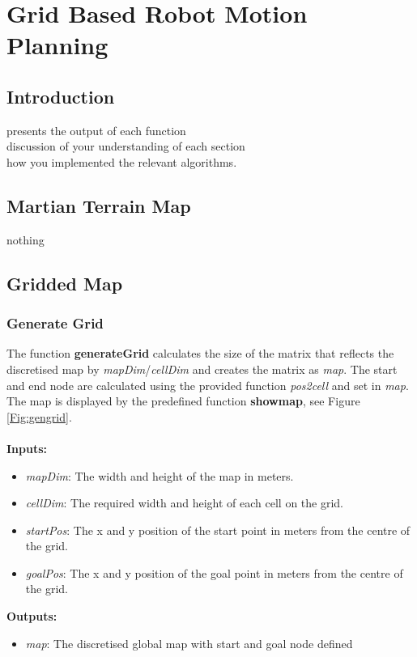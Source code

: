 \documentclass[Space3_Assign3.tex]{subfile}
\begin{document}
\section{Grid Based Robot Motion Planning} \label{Sec:Question1}
\subsection{Introduction}

presents the output of each function\\
discussion of your understanding of each section\\
how you implemented the relevant algorithms.

\subsection{Martian Terrain Map}
nothing
\subsection{Gridded Map}
\subsubsection{Generate Grid}\label{Sec:gengrid}
The function \textbf{generateGrid} calculates the size of the matrix that reflects the discretised map by \textit{mapDim}/\textit{cellDim} and creates the matrix as \textit{map}. The start and end node are calculated using the provided function \textit{pos2cell} and set in \textit{map}. The map is displayed by the predefined function \textbf{showmap}, see Figure \ref{Fig:gengrid}.\\\\
\textbf{Inputs:}
\begin{itemize}
\item \textit{mapDim}: The width and height of the map in meters.
\item \textit{cellDim}: The required width and height of each cell on the grid.
\item \textit{startPos}: The x and y position of the start point in meters from the centre of the grid.
\item \textit{goalPos}: The x and y position of the goal point in meters from the centre of the grid.
\end{itemize}
\textbf{Outputs:}
\begin{itemize}
\item \textit{map}: The discretised global map with start and goal node defined
\end{itemize}
\end{document}
